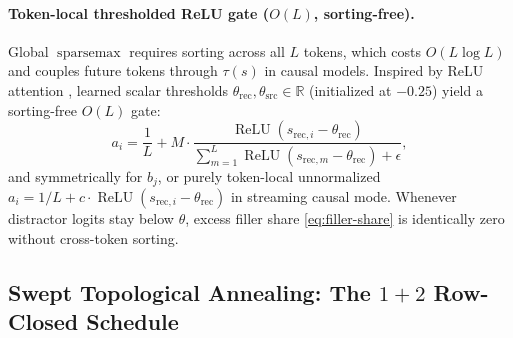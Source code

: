 \documentclass[11pt]{article}
\newcommand{\ReLU}{\operatorname{ReLU}}
\newcommand{\sparsemax}{\operatorname{sparsemax}}
\begin{document}
\paragraph{Token-local thresholded ReLU gate (\texorpdfstring{$O(L)$}{O(L)}, sorting-free).}
Global $\sparsemax$ requires sorting across all $L$ tokens, which costs $O(L\log L)$ and couples future tokens through $\tau(s)$ in causal models. Inspired by ReLU attention \citep{wortsman2023replacing}, learned scalar thresholds $\theta_{\text{rec}}, \theta_{\text{src}} \in \mathbb{R}$ (initialized at $-0.25$) yield a sorting-free $O(L)$ gate:
\begin{equation}
  a_i = \frac{1}{L} + M \cdot \frac{\ReLU(s_{\text{rec},i} - \theta_{\text{rec}})}{\sum_{m=1}^L \ReLU(s_{\text{rec},m} - \theta_{\text{rec}}) + \epsilon},
  \label{eq:relu-thresh}
\end{equation}
and symmetrically for $b_j$, or purely token-local unnormalized $a_i = 1/L + c\cdot\ReLU(s_{\text{rec},i} - \theta_{\text{rec}})$ in streaming causal mode. Whenever distractor logits stay below $\theta$, excess filler share \eqref{eq:filler-share} is identically zero without cross-token sorting.

\subsection{Swept Topological Annealing: The \texorpdfstring{$1+2$}{1+2} Row-Closed Schedule}
\label{sec:annealed}
\end{document}
